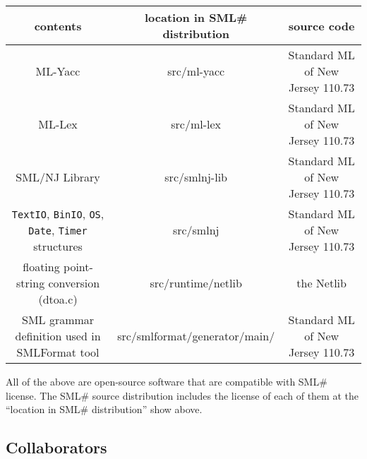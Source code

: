 \documentclass{jbook}
\newcommand{\txt}[2]{#2}
\newcommand{\smlsharp}{SML\#}
\begin{document}
\begin{center}
\begin{tabular}{|c|c|c|}
\hline
contents & location in \smlsharp{} distribution & source code
\\\hline
ML-Yacc & src/ml-yacc  & Standard ML of New Jersey 110.73
\\\hline
ML-Lex & src/ml-lex  & Standard ML of New Jersey 110.73
\\\hline
SML/NJ Library & src/smlnj-lib &  Standard ML of New Jersey 110.73
\\\hline
{\tt TextIO},
{\tt BinIO},
{\tt OS},
{\tt Date},
{\tt Timer}
structures
&
src/smlnj
&
Standard ML of New Jersey 110.73
\\\hline
floating point-string conversion
(dtoa.c)
&
src/runtime/netlib
&
the Netlib
\\\hline
SML grammar definition used 
in SMLFormat tool
&
src/smlformat/generator/main/
&
Standard ML of New Jersey 110.73
\\\hline
\end{tabular}
\end{center}

	All of the above are open-source software that are compatible
with \smlsharp{} license.
	The \smlsharp{} source distribution includes the license of each
of them at the ``location in \smlsharp{} distribution'' show above.
\fi%

\subsection{\txt{研究開発協力者}{Collaborators}}
\end{document}
